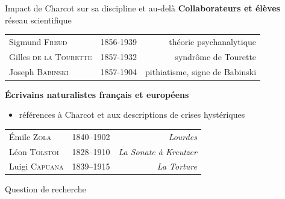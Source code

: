 \begin{frame}{Impact de Charcot sur sa discipline et au-delà}
\centering
\textbf{Collaborateurs et élèves}\\
{\small \og{}réseau scientifique\fg{}}
    \begin{table}[!ht]
        \centering
        \small
        \begin{tabular}{l l r}
           Sigmund \textsc{Freud} & 1856-1939  & théorie psychanalytique \\
            Gilles \textsc{de la Tourette} & 1857-1932 & syndrôme de Tourette \\
            Joseph \textsc{Babinski} & 1857-1904 & pithiatisme, signe de Babinski \\
        \end{tabular}
        \begin{flushright}
        \footnotesize\citep{BROUSSOLLE2012301}
        \end{flushright}
        \label{tab:my_label}
    \end{table}
\medskip
\textbf{Écrivains naturalistes français et européens} 
\begin{itemize}
\centering
\small \item références à Charcot et aux descriptions de crises hystériques
\end{itemize}
\begin{table}[!ht]
    \centering
    \small
    \begin{tabular}{l l r}
        Émile \textsc{Zola} & 1840–1902  & \textit{Lourdes} \\
        Léon \textsc{Tolstoï} & 1828–1910 & \textit{La Sonate à Kreutzer} \\
        Luigi \textsc{Capuana} & 1839–1915 & \textit{La Torture}
    \end{tabular}
            \begin{flushright}
        \footnotesize\citep{koehler2013charcot}
        \end{flushright}
    \label{tab:my_label}
\end{table}

\end{frame}

\begin{frame}{Question de recherche}
\begin{exampleblock}{}
\centering
\end{exampleblock}

\end{frame}
